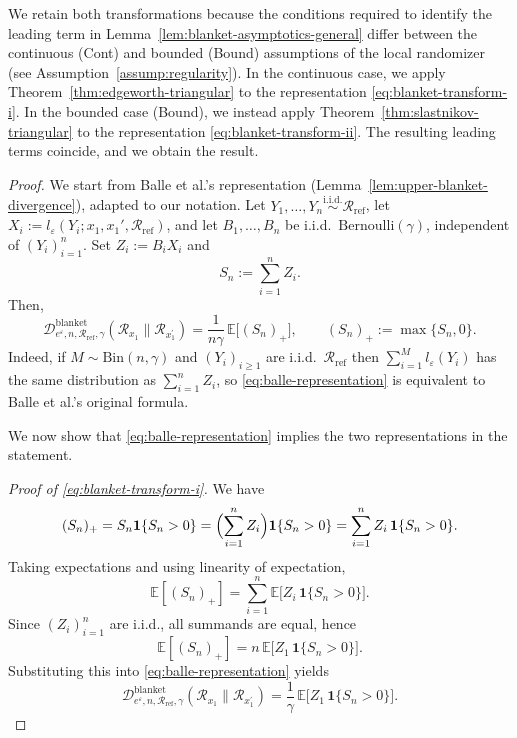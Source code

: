 \documentclass{article}
\theoremstyle{plain}
\theoremstyle{definition}
\begin{document}
We retain both transformations because the conditions required to identify the leading term in Lemma~\ref{lem:blanket-asymptotics-general} differ between the continuous (Cont) and bounded (Bound) assumptions of the local randomizer (see Assumption~\ref{assump:regularity}). 
In the continuous case, we apply Theorem~\ref{thm:edgeworth-triangular} to the representation \eqref{eq:blanket-transform-i}.
In the bounded case (Bound), we instead apply Theorem~\ref{thm:slastnikov-triangular} to the representation \eqref{eq:blanket-transform-ii}. 
The resulting leading terms coincide, and we obtain the result.



\begin{proof}
We start from Balle et al.'s representation (Lemma~\ref{lem:upper-blanket-divergence}), adapted to our notation.
Let $Y_1,\dots,Y_n \stackrel{\mathrm{i.i.d.}}{\sim}\mathcal R_{\mathrm{ref}}$,
let $X_i := l_\varepsilon(Y_i;x_1,x_1',\mathcal R_{\mathrm{ref}})$, and let
$B_1,\dots,B_n$ be i.i.d.\ $\mathrm{Bernoulli}(\gamma)$, independent of
$(Y_i)_{i=1}^n$. Set $Z_i := B_i X_i$ and
\[
  S_n := \sum_{i=1}^n Z_i.
\]
Then,
\begin{equation}
  \label{eq:balle-representation}
  \mathcal D^{\mathrm{blanket}}_{e^{\varepsilon},n,\mathcal R_{\mathrm{ref}},\gamma}(
    \mathcal{R}_{x_1} \| \mathcal{R}_{x_1^\prime})
  = \frac{1}{n\gamma}\,
    \mathbb E\bigl[(S_n)_+\bigr],
  \qquad
  (S_n)_+ := \max\{S_n,0\}.
\end{equation}
Indeed, if $M\sim\mathrm{Bin}(n,\gamma)$ and $(Y_i)_{i\ge1}$ are i.i.d.\
$\mathcal R_{\mathrm{ref}}$ then
$\sum_{i=1}^M l_\varepsilon(Y_i)$ has the same distribution as
$\sum_{i=1}^n Z_i$, so \eqref{eq:balle-representation} is equivalent to
Balle et al.'s original formula.

We now show that \eqref{eq:balle-representation} implies the two
representations in the statement.

\smallskip
\noindent\emph{Proof of \eqref{eq:blanket-transform-i}.}
We have
\[
  (S_n)_+
  = S_n \mathbf 1\{S_n>0\}
  = \Bigl(\sum_{i=1}^n Z_i\Bigr)\mathbf 1\{S_n>0\}
  = \sum_{i=1}^n Z_i\,\mathbf 1\{S_n>0\}.
\]
Taking expectations and using linearity of expectation,
\[
  \mathbb E[(S_n)_+]
  = \sum_{i=1}^n
      \mathbb E\bigl[Z_i\,\mathbf 1\{S_n>0\}\bigr].
\]
Since $(Z_i)_{i=1}^n$ are i.i.d., all summands are equal, hence
\[
  \mathbb E[(S_n)_+]
  = n\,\mathbb E\bigl[Z_1\,\mathbf 1\{S_n>0\}\bigr].
\]
Substituting this into \eqref{eq:balle-representation} yields
\begin{equation}
  \label{eq:D-blanket-Z1}
  \mathcal D^{\mathrm{blanket}}_{e^{\varepsilon},n,\mathcal R_{\mathrm{ref}},\gamma}(
    \mathcal{R}_{x_1} \| \mathcal{R}_{x_1^\prime})
  = \frac{1}{\gamma}\,
    \mathbb E\bigl[Z_1\,\mathbf 1\{S_n>0\}\bigr].
\end{equation}


\end{proof}
\end{document}
